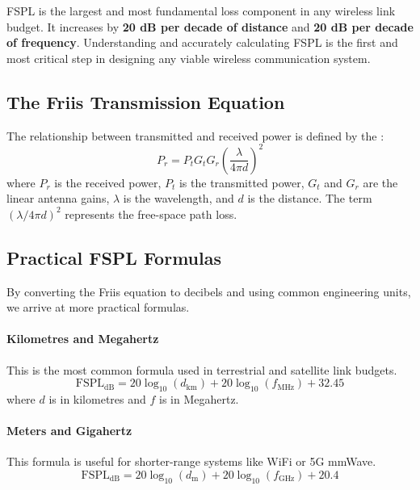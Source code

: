 \begin{keyconcept}
    FSPL is the largest and most fundamental loss component in any wireless link budget. It increases by \textbf{20 dB per decade of distance} and \textbf{20 dB per decade of frequency}. Understanding and accurately calculating FSPL is the first and most critical step in designing any viable wireless communication system.
\end{keyconcept}


\subsection{The Friis Transmission Equation}

The relationship between transmitted and received power is defined by the :
\begin{equation}
    P_r = P_t G_t G_r \left(\frac{\lambda}{4\pi d}\right)^2
    \label{eq:friis}
\end{equation}
where $P_r$ is the received power, $P_t$ is the transmitted power, $G_t$ and $G_r$ are the linear antenna gains, $\lambda$ is the wavelength, and $d$ is the distance. The term $(\lambda / 4\pi d)^2$ represents the free-space path loss.


\subsection{Practical FSPL Formulas}

By converting the Friis equation to decibels and using common engineering units, we arrive at more practical formulas.

\paragraph{Kilometres and Megahertz}
This is the most common formula used in terrestrial and satellite link budgets.
\begin{equation}
    \text{FSPL}_{\text{dB}} = 20\log_{10}(d_{\text{km}}) + 20\log_{10}(f_{\text{MHz}}) + 32.45
    \label{eq:fspl-eng}
\end{equation}
where $d$ is in kilometres and $f$ is in Megahertz.

\paragraph{Meters and Gigahertz}
This formula is useful for shorter-range systems like WiFi or 5G mmWave.
\begin{equation}
    \text{FSPL}_{\text{dB}} = 20\log_{10}(d_{\text{m}}) + 20\log_{10}(f_{\text{GHz}}) + 20.4
\end{equation}

